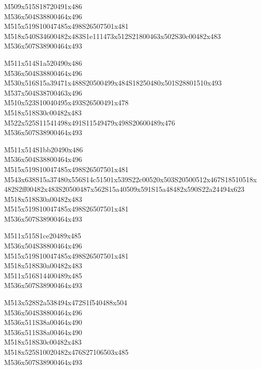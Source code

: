 \documentclass{article}
\begin{document}
\begin{multicols}{5}
\begin{center}

M509x515S18720491x486 %
\\M536x504S38800464x496 %
\\M515x519S10047485x498S26507501x481 %
\\M518x540S34600482x483S1e111473x512S21800463x502S30c00482x483 %
\\M536x507S38900464x493 %
\vfil
\columnbreak

M511x514S1a520490x486 %
\\M536x504S38800464x496 %
\\M530x516S15a39471x488S20500499x484S18250480x501S28801510x493 %
\\M537x504S38700463x496 %
\\M510x523S10040495x493S26500491x478 %
\\M518x518S30c00482x483 %
\\M522x525S11541498x491S11549479x498S20600489x476 %
\\M536x507S38900464x493 %
\vfil
\columnbreak

M511x514S1bb20490x486 %
\\M536x504S38800464x496 %
\\M515x519S10047485x498S26507501x481 %
\\M543x638S15a37480x556S14c51501x539S22c00520x503S20500512x467S18510518x482S2ff00482x483S20500487x562S15a40509x591S15a48482x590S22a24494x623 %
\\M518x518S30a00482x483 %
\\M515x519S10047485x498S26507501x481 %
\\M536x507S38900464x493 %
\vfil
\columnbreak

M511x515S1ce20489x485 %
\\M536x504S38800464x496 %
\\M515x519S10047485x498S26507501x481 %
\\M518x518S30a00482x483 %
\\M511x516S14400489x485 %
\\M536x507S38900464x493 %
\vfil
\columnbreak

M513x528S2a538494x472S1f540488x504 %
\\M536x504S38800464x496 %
\\M536x511S38a00464x490 %
\\M536x511S38a00464x490 %
\\M518x518S30c00482x483 %
\\M518x525S10020482x476S27106503x485 %
\\M536x507S38900464x493 %
\vfil

\end{center}
\end{multicols}
\end{document}
